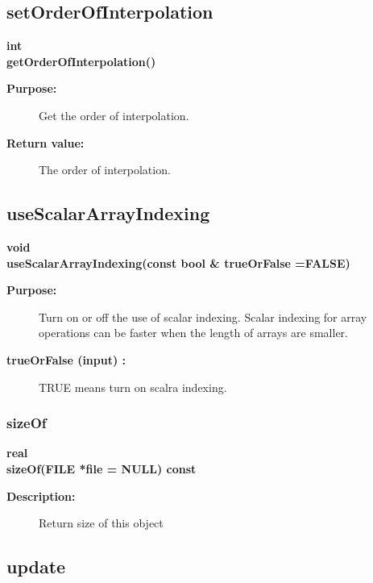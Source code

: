 \subsection{setOrderOfInterpolation}
 
\begin{flushleft} \textbf{%
int  \\ 
\settowidth{\DataPointMappingIncludeArgIndent}{getOrderOfInterpolation(}%
getOrderOfInterpolation()
}\end{flushleft}
\begin{description}
\item[{\bf Purpose:}]  
   Get the order of interpolation.
\item[{\bf Return value:}]  The order of interpolation.
\end{description}
\subsection{useScalarArrayIndexing}
 
\begin{flushleft} \textbf{%
void   \\ 
\settowidth{\DataPointMappingIncludeArgIndent}{useScalarArrayIndexing(}%
useScalarArrayIndexing(const bool \& trueOrFalse  =FALSE) 
}\end{flushleft}
\begin{description}
\item[{\bf Purpose:}]  
    Turn on or off the use of scalar indexing. Scalar indexing for array
 operations can be faster when the length of arrays are smaller.
\item[{\bf trueOrFalse (input) :}]  TRUE means turn on scalra indexing.
\end{description}
\subsubsection{sizeOf}
 
\begin{flushleft} \textbf{%
real  \\ 
\settowidth{\DataPointMappingIncludeArgIndent}{sizeOf(}%
sizeOf(FILE *file  = NULL) const
}\end{flushleft}
\begin{description}
\item[{\bf Description:}] 
   Return size of this object  
\end{description}
\subsection{update}
 
